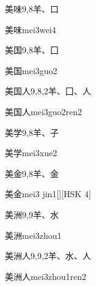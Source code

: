 \begin{entry}{美味}{9,8}{⽺、⼝}
  \begin{phonetics}{美味}{mei3wei4}
  \end{phonetics}
\end{entry}

\begin{entry}{美国}{9,8}{⽺、⼞}
  \begin{phonetics}{美国}{mei3guo2}
  \end{phonetics}
\end{entry}

\begin{entry}{美国人}{9,8,2}{⽺、⼞、⼈}
  \begin{phonetics}{美国人}{mei3guo2ren2}
  \end{phonetics}
\end{entry}

\begin{entry}{美学}{9,8}{⽺、⼦}
  \begin{phonetics}{美学}{mei3xue2}
  \end{phonetics}
\end{entry}

\begin{entry}{美金}{9,8}{⽺、⾦}
  \begin{phonetics}{美金}{mei3 jin1}[][HSK 4]
  \end{phonetics}
\end{entry}

\begin{entry}{美洲}{9,9}{⽺、⽔}
  \begin{phonetics}{美洲}{mei3zhou1}
  \end{phonetics}
\end{entry}

\begin{entry}{美洲人}{9,9,2}{⽺、⽔、⼈}
  \begin{phonetics}{美洲人}{mei3zhou1ren2}
  \end{phonetics}
\end{entry}

